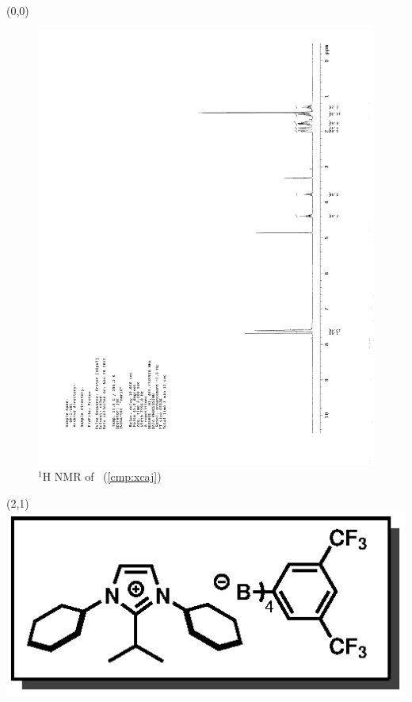 \begin{textblock}{20}(0,0)
\begin{figure}[htb]
\caption{$^1$H NMR of \CMPxcaj\ (\ref{cmp:xcaj})}
\includegraphics[scale=0.75, trim = 0mm 0mm 0mm 5mm,
clip]{chp_alkylation/images/nmr/xcajH}
\vspace{-100pt}
\end{figure}
\end{textblock}
\begin{textblock}{1}(2,1)
\includegraphics[scale=0.8, angle=90]{chp_alkylation/images/xcaj}
\end{textblock}

